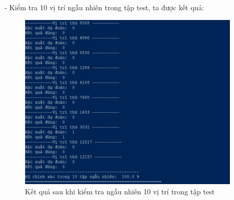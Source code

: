 \documentclass{report}
\newcommand\tab[1][1.25cm]{\hspace*{#1}}
\begin{document}
\begin{enumerate}
                \item [- ] Kiểm tra 10 vị trí ngẫu nhiên trong tập test, ta được kết quả:
                    \begin{center}
                        \begin{figure}[htp]
                            \begin{center}
                                \tab[1cm]\includegraphics[scale = 0.9]{image/MLP1.png}
                                \caption{Kết quả sau khi kiểm tra ngẫu nhiên 10 vị trí trong tập test}
                            \end{center}
                        \end{figure}
                    \end{center}
            \end{enumerate}
        
\end{document}
